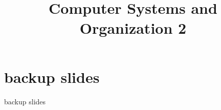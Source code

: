 \date{}
\title{Computer Systems and Organization 2}
\date{}

\begin{frame}
    \titlepage
\end{frame}





\section{backup slides}
\begin{frame}{backup slides}
\end{frame}


